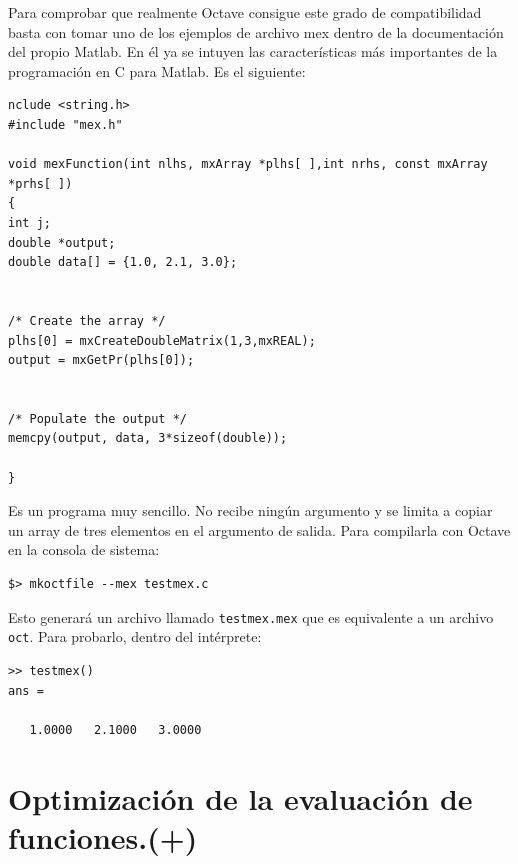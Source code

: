 Para comprobar que realmente Octave consigue este grado de
compatibilidad basta con tomar uno de los ejemplos de archivo mex
dentro de la documentación del propio Matlab.  En él ya se intuyen las
características más importantes de la programación en C para
Matlab. Es el siguiente:

\begin{verbatim}
nclude <string.h>
#include "mex.h"

void mexFunction(int nlhs, mxArray *plhs[ ],int nrhs, const mxArray *prhs[ ])
{
int j;
double *output;
double data[] = {1.0, 2.1, 3.0};


/* Create the array */
plhs[0] = mxCreateDoubleMatrix(1,3,mxREAL);
output = mxGetPr(plhs[0]);


/* Populate the output */
memcpy(output, data, 3*sizeof(double));

}
\end{verbatim}

Es un programa muy sencillo.  No recibe ningún argumento y se limita a
copiar un array de tres elementos en el argumento de
salida. Para compilarla con Octave en la consola de sistema:

\begin{verbatim}
$> mkoctfile --mex testmex.c
\end{verbatim}

Esto generará un archivo llamado \texttt{testmex.mex} que es
equivalente a un archivo \texttt{oct}.  Para probarlo, dentro del
intérprete:

\begin{verbatim}
>> testmex()
ans =

   1.0000   2.1000   3.0000
\end{verbatim}


\section{Optimización de la evaluación de funciones.(+)}

